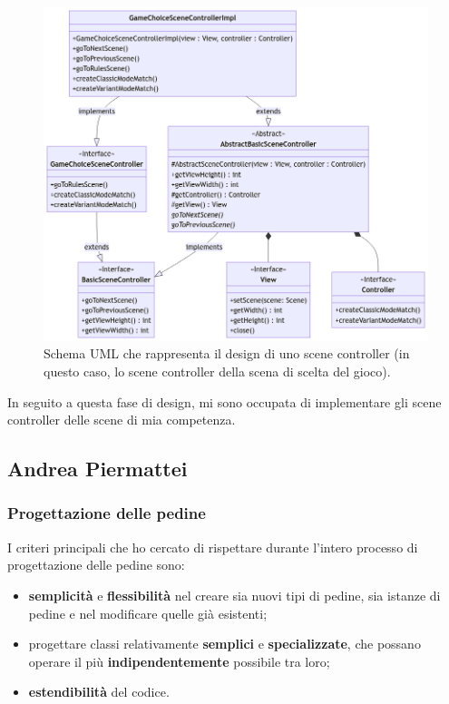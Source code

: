 \documentclass[a4paper,12pt]{report}
\begin{document}
\begin{figure}[H]
\centering
\includegraphics[width=\textwidth]{images/game-choice-scene-controller.png}
\caption{Schema UML che rappresenta il design di uno scene controller (in questo caso, lo scene controller della scena di scelta del gioco).}
\label{images:game-choice-scene-controller}
\end{figure}

In seguito a questa fase di design, mi sono occupata di implementare gli scene controller delle scene di mia competenza.

\subsection{Andrea Piermattei}
\subsubsection{Progettazione delle pedine}
I criteri principali che ho cercato di rispettare durante l'intero processo di progettazione delle pedine sono:
\begin{itemize}
\item \textbf{semplicità} e \textbf{flessibilità} nel creare sia nuovi tipi di pedine, sia istanze di pedine e nel modificare quelle già esistenti;
\item progettare classi relativamente \textbf{semplici} e \textbf{specializzate}, che possano operare il più \textbf{indipendentemente} possibile tra loro;
\item \textbf{estendibilità} del codice.
\end{itemize}
\end{document}
